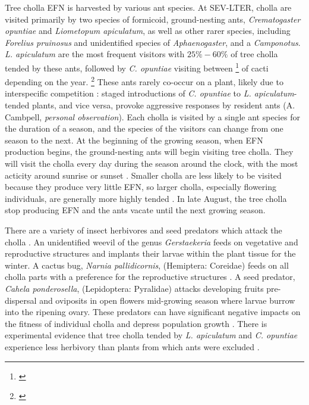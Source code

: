 \documentclass[11pt]{article}
\newcommand{\tom}[2]{{\color{red}{#1}}\footnote{\textit{\color{red}{#2}}}}
\begin{document}
Tree cholla EFN is harvested by various ant species. 
At SEV-LTER, cholla are visited primarily by two species of formicoid, ground-nesting ants, \textit{Crematogaster opuntiae} and \textit{Liometopum apiculatum}, as well as other rarer species, including \textit{Forelius pruinosus} and unidentified species of \textit{Aphaenogaster}, and a \textit{Camponotus}.
\textit{L. apiculatum} are the most frequent visitors with $25\% - 60\%$ of tree cholla tended by these ants, followed by \textit{C. opuntiae} visiting between \tom{$0\% - 20\%$}{Are there years with zero CREM?} of cacti \citep{Donald2022} depending on the year. \tom{Up to $80\%$ of cacti remain vacant in any given year. }{This is probably the extreme high end of vacancy. I would give the ranges as you did the others.}
These ants rarely co-occur on a plant, likely due to interspecific competition \citep{Miller2007}: staged introductions of \textit{C. opuntiae} to \textit{L. apiculatum}-tended plants, and vice versa, provoke aggressive responses by resident ants (A. Cambpell, \textit{personal observation}).
Each cholla is visited by a single ant species for the duration of a season, and the species of the visitors can change from one season to the next. 
At the beginning of the growing season, when EFN production begins, the ground-nesting ants will begin visiting tree cholla.
They will visit the cholla every day during the season around the clock, with the most acticity around sunrise or sunset \citep{Ohm2014}. 
Smaller cholla are less likely to be visited because they produce very little EFN, so larger cholla, especially flowering individuals, are generally more highly tended \citep{Miller2014}. 
In late August, the tree cholla stop producing EFN and the ants vacate until the next growing season. 

There are a variety of insect herbivores and seed predators which attack the cholla \citep{Mann1969}. 
An unidentified weevil of the genus \textit{Gerstaekeria} feeds on vegetative and reproductive structures and implants their larvae within the plant tissue for the winter. 
A cactus bug, \textit{Narnia pallidicornis}, (Hemiptera: Coreidae) feeds on all cholla parts with a preference for the reproductive structures \citep{Miller2006}.
A seed predator, \textit{Cahela ponderosella}, (Lepidoptera: Pyralidae) attacks developing fruits pre-dispersal and oviposits in open flowers mid-growing season where larvae burrow into the ripening ovary. 
These predators can have significant negative impacts on the fitness of individual cholla and depress population growth \citep{Miller2009}.
There is experimental evidence that tree cholla tended by \textit{L. apiculatum} and \textit{C. opuntiae} experience less herbivory than plants from which ants were excluded \citep{Miller2007}. 
\end{document}
